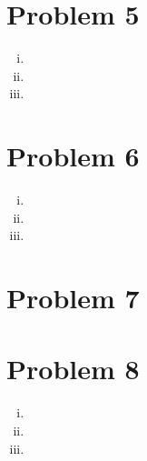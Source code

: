 \documentclass[11pt]{article} %
\begin{document}


\section*{Problem 5}
\begin{enumerate}[i.)]
\item
\item
\item
\end{enumerate}
\section*{Problem 6}
\begin{enumerate}[i.)]
\item
\item
\item
\end{enumerate}
\section*{Problem 7}

\section*{Problem 8}
\begin{enumerate}[i.)]
\item
\item
\item
\end{enumerate}
\end{document}
